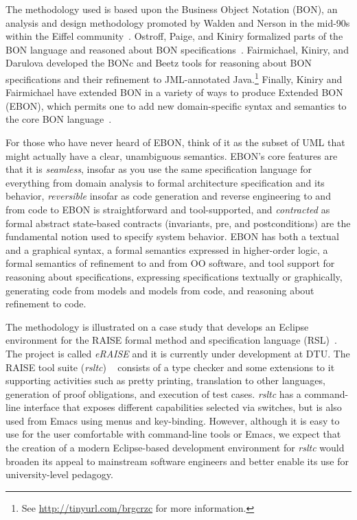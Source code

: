 \documentclass[letterpaper,conference]{IEEEtran}
\begin{document}
The methodology used is based upon the Business Object Notation (BON),
an analysis and design methodology promoted by Walden and Nerson in
the mid-90s within the Eiffel community~\cite{WaldenNerson95}.
Ostroff, Paige, and Kiniry formalized parts of the BON language and
reasoned about BON
specifications~\cite{LancaricOstroffPaige02,EBON01,PaigeEtal02,PaigeOstroff01b}.
Fairmichael, Kiniry, and Darulova developed the BONc and Beetz tools
for reasoning about BON specifications and their refinement to
JML-annotated Java.\footnote{See \url{http://tinyurl.com/brgcrzc} for
  more information.}  Finally, Kiniry and Fairmichael have extended
BON in a variety of ways to produce Extended BON (EBON), which permits
one to add new domain-specific syntax and semantics to the core BON
language~\cite{Kiniry02-PhDThesis}.

For those who have never heard of EBON, think of it as the subset
of UML that might actually have a clear, unambiguous semantics.
EBON's core features are that it is \emph{seamless}, insofar as you
use the same specification language for everything from domain
analysis to formal architecture specification and its behavior,
\emph{reversible} insofar as code generation and reverse engineering
to and from code to EBON is straightforward and tool-supported, and
\emph{contracted} as formal abstract state-based contracts
(invariants, pre, and postconditions) are the fundamental notion used
to specify system behavior.  EBON has both a textual and a graphical
syntax, a formal semantics expressed in higher-order logic, a formal
semantics of refinement to and from OO software, and tool support for
reasoning about specifications, expressing specifications textually or
graphically, generating code from models and models from code, and
reasoning about refinement to code.

The methodology is illustrated on a case study that develops an
Eclipse environment for the RAISE formal method %
and specification language (RSL)~\cite{RLG92}. The project is called
\emph{eRAISE} and it is currently under development at DTU.
The RAISE tool suite (\emph{rsltc}) ~\cite{rsltcUserGuide,RAISETools2003}
consists of a type checker and some extensions to it supporting
activities such as pretty printing, %
translation to other languages, generation of proof obligations,
and execution of test cases.
\emph{rsltc} has a command-line interface that exposes different
capabilities selected via switches, but is also used from Emacs using
menus and key-binding. However, although it is easy to use for the
user comfortable with command-line tools or Emacs, we expect that the
creation of a modern Eclipse-based development environment for
\emph{rsltc} would broaden its appeal to mainstream software engineers
and better enable its use for university-level pedagogy.
\end{document}
